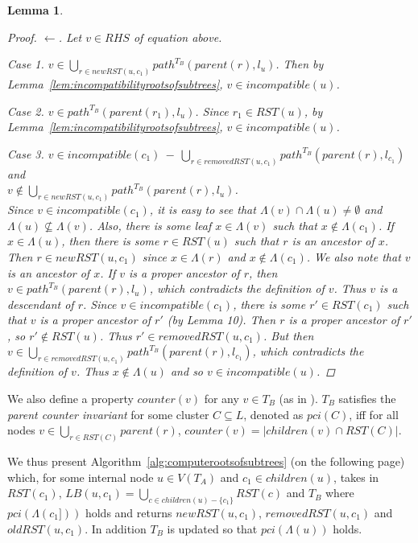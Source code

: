\documentclass{article}
\newcommand{\leafset}{\Lambda}
\newtheorem{incompatibilityrecursive}[incompatibility]{Lemma}
\begin{document}
\begin{incompatibilityrecursive}
\begin{proof}
            $\longleftarrow$. Let $v \in RHS$ of equation above.

            \textit{Case 1.} $v \in \bigcup_{r \in newRST(u, c_1)} path^{T_B}(parent(r), l_u)$. Then by Lemma~\ref{lem:incompatibilityrootsofsubtrees}, $v \in incompatible(u)$.

            \textit{Case 2.} $v \in path^{T_B}(parent(r_1), l_u)$. Since $r_1 \in RST(u)$, by Lemma~\ref{lem:incompatibilityrootsofsubtrees}, $v \in incompatible(u)$.

            \textit{Case 3.} $v \in incompatible(c_1)\ -\ \bigcup_{r \in removedRST(u, c_1)} path^{T_B}(parent(r), l_{c_1})$ and\\[0.25em] %
            $v \not\in \bigcup_{r \in newRST(u, c_1)} path^{T_B}(parent(r), l_u)$.\\[0.25em]
            Since $v \in incompatible(c_1)$, it is easy to see that $\leafset(v) \cap \leafset(u) \neq \emptyset$ and $\leafset(u) \not\subseteq \leafset(v)$. Also, there is some leaf $x \in \leafset(v)$ such that $x \not\in \leafset(c_1)$. If $x \in \leafset(u)$, then there is some $r \in RST(u)$ such that $r$ is an ancestor of $x$. Then $r \in newRST(u, c_1)$ since $x \in \leafset(r)$ and $x \not\in \leafset(c_1)$. We also note that $v$ is an ancestor of $x$. If $v$ is a proper ancestor of $r$, then $v \in path^{T_B}(parent(r), l_u)$, which contradicts the definition of $v$. Thus $v$ is a descendant of $r$. Since $v \in incompatible(c_1)$, there is some $r' \in RST(c_1)$ such that $v$ is a proper ancestor of $r'$ (by Lemma 10). Then $r$ is a proper ancestor of $r'$, so $r' \not\in RST(u)$. Thus $r' \in removedRST(u, c_1)$. But then $v \in \bigcup_{r \in removedRST(u, c_1)} path^{T_B}(parent(r), l_{c_1})$, which contradicts the definition of $v$. Thus $x \not\in \leafset(u)$ and so $v \in incompatible(u)$.
        \end{proof}
    \end{incompatibilityrecursive}

    We also define a property $counter(v)$ for any $v \in T_B$ (as in \cite{jansson2018algorithms}). $T_B$ satisfies the \textit{parent counter invariant} for some cluster $C \subseteq L$, denoted as $pci(C)$, iff for all nodes $v \in \bigcup_{r \in RST(C)} parent(r)$, $counter(v) = |children(v) \cap RST(C)|$.

    We thus present Algorithm~\ref{alg:computerootsofsubtrees} (on the following page) which, for some internal node $u \in V(T_A)$ and $c_1 \in children(u)$, takes in $RST(c_1)$, $LB(u, c_1) = \bigcup_{c \in children(u) - \{c_1\}} RST(c)$ and $T_B$ where $pci(\leafset(c_1]))$ holds and returns $newRST(u, c_1)$, $removedRST(u, c_1)$ and $oldRST(u, c_1)$. In addition $T_B$ is updated so that $pci(\leafset(u))$ holds.
\end{document}
